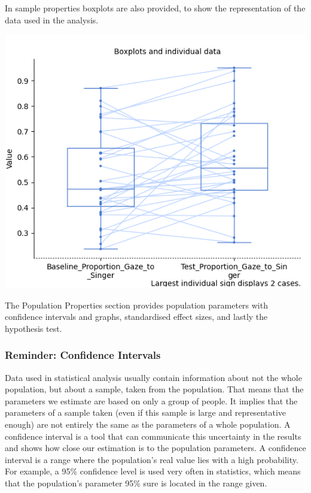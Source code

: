 \documentclass[
]{book}
\begin{document}
In sample properties boxplots are also provided, to show the representation of the data used in the analysis.

\includegraphics{img/ch6/6.7comparerepeatedmeasures_boxplot.png}

The Population Properties section provides population parameters with confidence intervals and graphs, standardised effect sizes, and lastly the hypothesis test.

\hypertarget{reminder-confidence-intervals}{%
\subsubsection{Reminder: Confidence Intervals}\label{reminder-confidence-intervals}}

Data used in statistical analysis usually contain information about not the whole population, but about a sample, taken from the population. That means that the parameters we estimate are based on only a group of people. It implies that the parameters of a sample taken (even if this sample is large and representative enough) are not entirely the same as the parameters of a whole population. A confidence interval is a tool that can communicate this uncertainty in the results and shows how close our estimation is to the population parameters. A confidence interval is a range where the population's real value lies with a high probability. For example, a 95\% confidence level is used very often in statistics, which means that the population's parameter 95\% sure is located in the range given.
\end{document}
